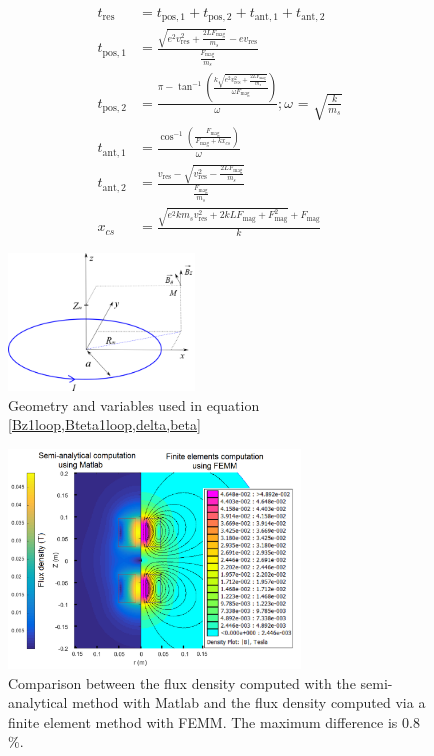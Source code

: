 \documentclass[letterpaper, 10 pt, journal, twoside]{ieeetran}
\begin{document}
\begin{align}
\label{tres6}
t_\text{res}&=t_{\text{pos},1}+t_{\text{pos},2}+t_{\text{ant},1}+t_{\text{ant},2}\\
\label{tres1}
t_{\text{pos},1}&=\frac{\sqrt{e^2 v_{\text{res}}^2+\frac{2 L F_{\text{mag}}}{m_s}}-e v_{\text{res}}}{\frac{F_{\text{mag}}}{m_s}}\\
t_{\text{pos},2}&=\frac{\pi -\tan ^{-1}\left(\frac{k \sqrt{e^2 v_{\text{res}}^2+\frac{2 L F_{\text{mag}}}{m_s}}}{\omega  F_{\text{mag}}}\right)}{\omega } ; \text{$\omega $ = }
\sqrt{\frac{k}{m_s}}
\label{tres2}\\
t_{\text{ant},1}&=\frac{\cos ^{-1}\left(\frac{F_{\text{mag}}}{F_{\text{mag}}+k x_{cs}}\right)}{\omega }
\label{tres3}\\
t_{\text{ant},2}&=\frac{v_{\text{res}}-\sqrt{v_{\text{res}}^2-\frac{2 L F_{\text{mag}}}{m_s}}}{\frac{F_{\text{mag}}}{m_s}}
\label{tres4}\\
x_{cs}&=\frac{\sqrt{e^2 k m_s v_{\text{res}}^2+2 k L F_{\text{mag}}+F_{\text{mag}}^2}+F_{\text{mag}}}{k}
\label{tres5}
\end{align}
\begin{figure}\centering
	\includegraphics[width=140pt]{single_loop.png}
	\caption{Geometry and variables used in equation \cref{Bz1loop,Bteta1loop,delta,beta}}
	\label{single_loop_geometry}
\end{figure}

\begin{figure}\centering
	\includegraphics[width=220pt]{Femm_matlab_comparison.png}
	\caption{Comparison between the flux density computed with the semi-analytical method with {\sc Matlab} and the flux density computed via a finite element method with FEMM. The maximum difference is 0.8 \%.}
	\label{Femm_matlab_comparison}
\end{figure}
\end{document}
